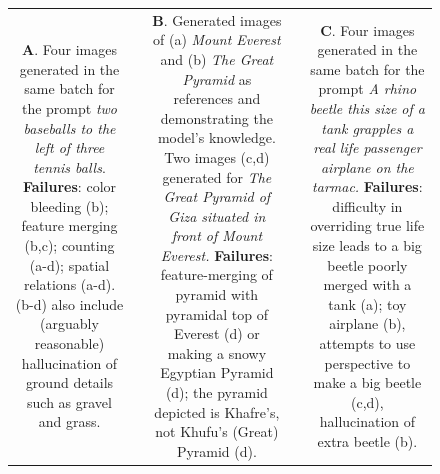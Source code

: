 \begin{figure}
\begin{adjustwidth}{-0.8in}{-0.5in}
\begin{tabular}{cccccccccccccccccccc}
\multicolumn{6}{C{\thirdcolwidth\textwidth}}{\tiny \textbf{A}. Four images generated in the same batch for the prompt  \textit{two baseballs to the left of three tennis balls}. \textbf{Failures}: color bleeding (b); feature merging (b,c); counting (a-d); spatial relations (a-d). (b-d) also include (arguably reasonable) hallucination of ground details such as gravel and grass.} && 
\multicolumn{6}{C{\thirdcolwidth\textwidth}}{\tiny \textbf{B}. Generated images of (a) \textit{Mount Everest} and (b) \textit{The Great Pyramid} as references and demonstrating the model's knowledge. Two images (c,d) generated for \textit{The Great Pyramid of Giza situated in front of Mount Everest.} \textbf{Failures}: feature-merging of pyramid with pyramidal top of Everest (d) or making a snowy Egyptian Pyramid (d); the pyramid depicted is Khafre's, not Khufu's (Great) Pyramid (d).} && 
\multicolumn{6}{C{\thirdcolwidth\textwidth}}{\tiny \textbf{C}. Four images generated in the same batch for the prompt  \textit{A rhino beetle this size of a tank grapples a real life passenger airplane on the tarmac.} \textbf{Failures}: difficulty in overriding true life size leads to a big beetle poorly merged with a tank (a); toy airplane (b), attempts to use perspective to make a big beetle (c,d), hallucination of extra beetle (b).} \\


\end{tabular}
\end{adjustwidth}
\end{figure}
